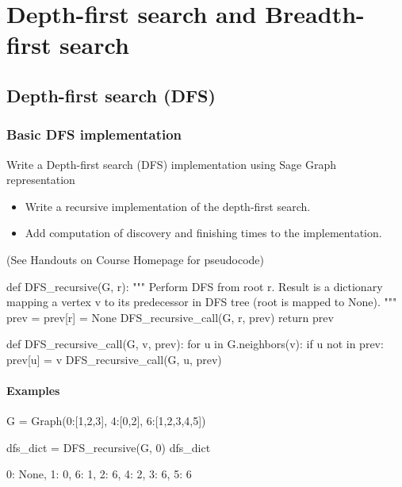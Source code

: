 \chapter{Depth-first search and Breadth-first search}

\section{Depth-first search (DFS)}

\subsection{Basic DFS implementation}

Write a Depth-first search (DFS) implementation using Sage Graph representation
\begin{itemize}
  \item Write a recursive implementation of the depth-first search.
  \item Add computation of discovery and finishing times to the implementation.
\end{itemize}
(See Handouts on Course Homepage for pseudocode)

\medskip
\begin{sageCell}
def DFS_recursive(G, r):
    """
    Perform DFS from root r. Result is a dictionary mapping a vertex v to
    its predecessor in DFS tree (root is mapped to None).
    """
    prev = {}
    prev[r] = None
    DFS_recursive_call(G, r, prev)
    return prev

def DFS_recursive_call(G, v, prev):
    for u in G.neighbors(v):
        if u not in prev:
            prev[u] = v
            DFS_recursive_call(G, u, prev)
\end{sageCell}

\subsubsection*{Examples}

\begin{sageCell}
   G = Graph({0:[1,2,3], 4:[0,2], 6:[1,2,3,4,5]})

   dfs_dict = DFS_recursive(G, 0)
   dfs_dict
\end{sageCell}
\begin{outCell}
   {0: None, 1: 0, 6: 1, 2: 6, 4: 2, 3: 6, 5: 6}
\end{outCell}

